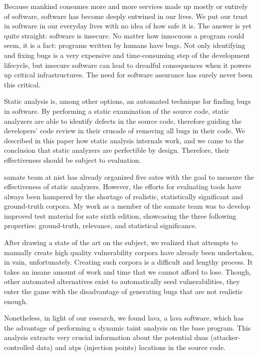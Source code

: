 Because mankind consumes more and more services made up mostly or entirely of software, software has become deeply entwined in our lives. We put our trust in software in our everyday lives with no idea of how safe it is. The answer is yet quite straight: software is insecure. No matter how innocuous a program could seem, it is a fact: programs written by humans have bugs. Not only identifying and fixing bugs is a very expensive and time-consuming step of the development lifecycle, but insecure software can lead to dreadful consequences when it powers up critical infrastructures. The need for software assurance has surely never been this critical.

Static analysis is, among other options, an automated technique for finding bugs in software. By performing a static examination of the source code, static analyzers are able to identify defects in the source code, therefore guiding the developers' code review in their crusade of removing all bugs in their code. We described in this paper how static analysis internals work, and we came to the conclusion that static analyzers are perfectible by design. Therefore, their effectiveness should be subject to evaluation.

\gls{samate} team at \gls{nist} has already organized five \glspl{sate} with the goal to measure the effectiveness of static analyzers. However, the efforts for evaluating tools have always been hampered by the shortage of realistic, statistically significant and ground-truth corpora. My work as a member of the \gls{samate} team was to develop improved test material for \gls{sate} sixth edition, showcasing the three following properties: ground-truth, relevance, and statistical significance.

After drawing a state of the art on the subject, we realized that attempts to manually create high quality vulnerability corpora have already been undertaken, in vain, unfortunately. Creating such corpora is a difficult and lengthy process. It takes an insane amount of work and time that we cannot afford to lose. Though, other automated alternatives exist to automatically seed vulnerabilities, they enter the game with the disadvantage of generating bugs that are not realistic enough.

Nonetheless, in light of our research, we found \gls{lava}, a \acrlong{lava} software, which has the advantage of performing a dynamic taint analysis on the base program. This analysis extracts very crucial information about the potential \glspl{dua} (attacker-controlled data) and \glspl{atp} (injection points) locations in the source code.

